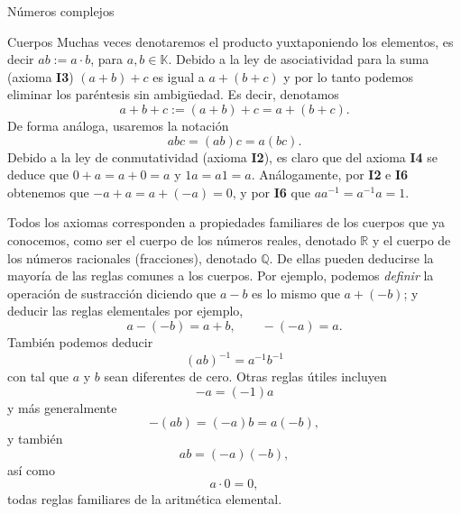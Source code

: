 \documentclass[a4paper,12pt,twoside,spanish,reqno]{amsbook}
\numberwithin{equation}{section}
\theoremstyle{definition}
\theoremstyle{remark}
\newcommand{\Q}{\mathbb Q}
\newcommand{\R}{\mathbb R}
\newcommand{\K}{\mathbb K}
\begin{document}
\begin{chapter}{Números complejos}
\begin{section}{Cuerpos}
        Muchas veces denotaremos el producto yuxtaponiendo los elementos,  es decir $ab := a\cdot b$, para $a,b \in \K$. Debido a la ley de asociatividad para la suma (axioma {\bf I3}) $(a+b)+c$ es igual a $a+(b+c)$ y por lo tanto podemos eliminar los paréntesis sin ambigüedad. Es decir, denotamos
        $$
        a+b+c := (a+b)+c = a+(b+c).
        $$
        De forma análoga, usaremos la notación
        $$
        abc = (ab)c = a(bc).
        $$
        Debido a la ley de conmutatividad (axioma {\bf I2}), es claro que del axioma {\bf I4} se deduce que  $0+a=a+0=a$ y $1a = a1=a$. Análogamente,  por  {\bf I2} e  {\bf I6} obtenemos que  $-a+a =   
        a+(-a)=0$, y por {\bf I6} que  $a a^{-1} = a^{-1}a=1$.
        
        
        
        Todos los axiomas corresponden a propiedades familiares de los cuerpos que ya conocemos,  como ser el cuerpo de los números reales, denotado $\R$ y el cuerpo de los números racionales (fracciones),  denotado $\Q$. De ellas pueden deducirse la mayoría de las reglas comunes a los cuerpos. Por ejemplo, podemos {\it definir} la operación de sustracción diciendo que $a-b$ es lo mismo que $a+(-b)$; y deducir las reglas elementales por ejemplo,
        \begin{equation*}
        a-(-b) = a+b, \qquad -(-a) = a.
        \end{equation*}	
        También podemos deducir
        \begin{equation*}
        (ab)^{-1} = a^{-1}b^{-1}
        \end{equation*}
        con tal que $a$ y $b$ sean diferentes de cero. Otras reglas útiles incluyen	
        \begin{equation*}
        -a = (-1)a 
        \end{equation*}					
        y más generalmente
        \begin{equation*}
        - (ab) = (-a) b = a  (-b),
        \end{equation*}	
        y  también 
        \begin{equation*}
        ab = (-a) (-b),
        \end{equation*}
        así como
        \begin{equation*}
        a\cdot 0 = 0,
        \end{equation*}
        todas reglas familiares de la aritmética elemental.
    \end{section}
    

\end{chapter}
\end{document}
